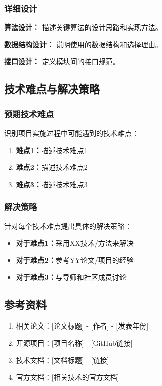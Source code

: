 \documentclass[a4paper,12pt]{article}
\begin{document}
\subsubsection{详细设计}

\textbf{算法设计：}
描述关键算法的设计思路和实现方法。

\textbf{数据结构设计：}
说明使用的数据结构和选择理由。

\textbf{接口设计：}
定义模块间的接口规范。

\subsection{技术难点与解决策略}

\subsubsection{预期技术难点}
识别项目实施过程中可能遇到的技术难点：
\begin{enumerate}
    \item \textbf{难点1：}描述技术难点1
    \item \textbf{难点2：}描述技术难点2
    \item \textbf{难点3：}描述技术难点3
\end{enumerate}

\subsubsection{解决策略}
针对每个技术难点提出具体的解决策略：
\begin{itemize}
    \item \textbf{对于难点1：}采用XX技术/方法来解决
    \item \textbf{对于难点2：}参考YY论文/项目的经验
    \item \textbf{对于难点3：}与导师和社区成员讨论
\end{itemize}

\subsection{参考资料}

\begin{enumerate}
    \item 相关论文：[论文标题] - [作者] - [发表年份]
    \item 开源项目：[项目名称] - [GitHub链接]
    \item 技术文档：[文档标题] - [链接]
    \item 官方文档：[相关技术的官方文档]
\end{enumerate}
\end{document}
